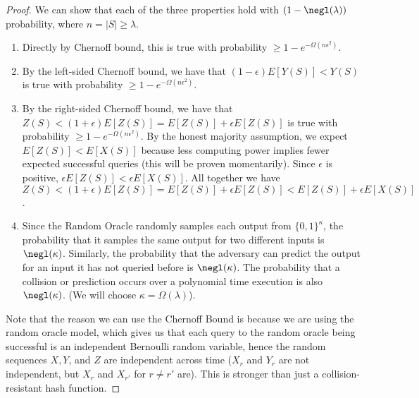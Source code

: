 \begin{proof} We can show that each of the three properties hold with $(1-\negl(\lambda))$ probability, where $n=|S| \geq \lambda$.

\begin{enumerate}
    \item Directly by Chernoff bound, this is true with probability $\geq 1 - e^{-\Omega(n\epsilon^2)}$.

    \item By the left-sided Chernoff bound, we have that $(1-\epsilon) E[Y(S)] < Y(S) $ is true with probability $\geq 1 - e^{-\Omega(n\epsilon^2)}$.

    \item By the right-sided Chernoff bound, we have that $ Z(S) < (1+\epsilon) E[Z(S)] = E[Z(S)] + \epsilon E[Z(S)] $ is true with probability $\geq 1 - e^{-\Omega(n\epsilon^2)}$. By the honest majority assumption, we expect $E[Z(S)] < E[X(S)]$ because less computing power implies fewer expected successful queries (this will be proven momentarily). Since $\epsilon$ is positive, $\epsilon E[Z(S)] < \epsilon E[X(S)]$. All together we have $ Z(S) < (1+\epsilon) E[Z(S)] = E[Z(S)] + \epsilon E[Z(S)] < E[Z(S)] + \epsilon E[X(S)]$.

    \item Since the Random Oracle randomly samples each output from $\{0,1\}^{\kappa}$, the probability that it samples the same output for two different inputs is $\negl(\kappa)$. Similarly, the probability that the adversary can predict the output for an input it has not queried before is $\negl(\kappa)$. The probability that a collision or prediction occurs over a polynomial time execution is also $\negl(\kappa)$. (We will choose $\kappa = \Omega(\lambda)$).
\end{enumerate}

Note that the reason we can use the Chernoff Bound is because we are using the random oracle model, which gives us that each query to the random oracle being successful is an independent Bernoulli random variable, hence the random sequences $X, Y$, and $Z$ are independent across time ($X_r$ and $Y_r$ are not independent, but $X_r$ and $X_{r'}$ for $r \neq r'$ are). This is stronger than just a collision-resistant hash function.

\end{proof}

